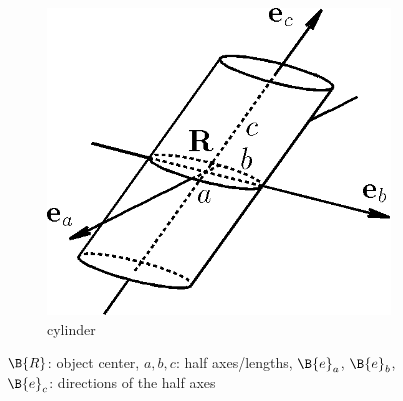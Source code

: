 \begin{figure}[htb]
\begin{subfigure}[b]{0.3\textwidth}
   \includegraphics[width=\textwidth]{ZYLINDER.png}
   \caption{cylinder}
   \label{fig:opo_cyl}
\end{subfigure}
\caption{$\B{R}$: object center,
$a, b, c$: half axes/lengths,
$\B{e}_a$, $\B{e}_b$, $\B{e}_c$: directions of the half axes
}
\label{fig:opo}
\end{figure}

